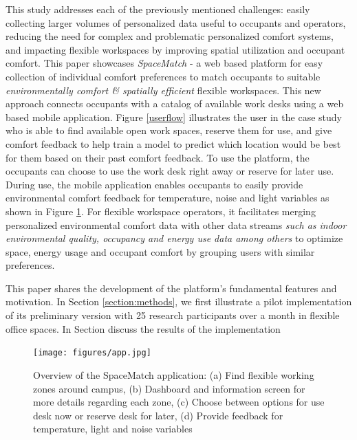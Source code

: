\documentclass[]{interact}
\theoremstyle{plain}%
\theoremstyle{definition}
\theoremstyle{remark}
\begin{document}
This study addresses each of the previously mentioned challenges: easily collecting larger volumes of personalized data useful to occupants and operators, reducing the need for complex and problematic personalized comfort systems, and impacting flexible workspaces by improving spatial utilization and occupant comfort. This paper showcases \emph{SpaceMatch} - a web based platform for easy collection of individual comfort preferences to match occupants to suitable \emph{environmentally comfort \& spatially efficient} flexible workspaces. This new approach connects occupants with a catalog of available work desks using a web based mobile application. Figure \ref{userflow} illustrates the user in the case study who is able to find available open work spaces, reserve them for use, and give comfort feedback to help train a model to predict which location would be best for them based on their past comfort feedback. To use the platform, the occupants can choose to use the work desk right away or reserve for later use. During use, the mobile application enables occupants to easily provide environmental comfort feedback for temperature, noise and light variables as shown in Figure \ref{app}. For flexible workspace operators, it facilitates merging personalized environmental comfort data with other data streams \emph{such as indoor environmental quality, occupancy and energy use data among others} to optimize space, energy usage and occupant comfort by grouping users with similar preferences. 

This paper shares the development of the platform's fundamental features and motivation. In Section \ref{section:methods}, we first illustrate a pilot implementation of its preliminary version with 25 research participants over a month in flexible office spaces. In Section  discuss the results of the implementation

\begin{figure}[ht!]
\centering
\texttt{[image: figures/app.jpg]}
\caption{Overview of the SpaceMatch application: (a) Find flexible working zones around campus, (b) Dashboard and information screen for more details regarding each zone, (c) Choose between options for use desk now or reserve desk for later, (d) Provide feedback for temperature, light and noise variables} 
\label{app}
\end{figure}
\end{document}
